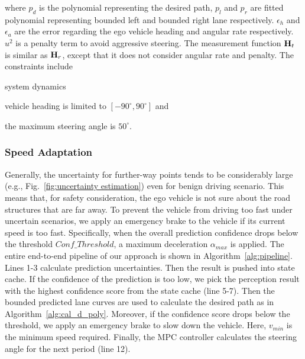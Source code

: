 where $p_{d}$ is the polynomial representing the desired path, $p_{l}$ and $p_{r}$ are fitted polynomial representing bounded left and bounded right lane respectively. $\epsilon_{h}$ and $\epsilon_{a}$ are the error regarding the ego vehicle heading and angular rate respectively. $u^{2}$ is a penalty term to avoid aggressive steering. The measurement function $\bold{H}_{t}$ is similar as $\bold{H}_{r}$, except that it does not consider angular rate and penalty. The constraints include
\begin{enumerate*}
\item system dynamics
\item vehicle heading is limited to $[-90^{\circ},90^{\circ}]$ and
\item the maximum steering angle is $50^{\circ}$.
\end{enumerate*}
\subsubsection{Speed Adaptation}
Generally, the uncertainty for further-way points tends to be considerably large (e.g., Fig.~\ref{fig:uncertainty estimation}) even for benign driving scenario. This means that, for safety consideration, the ego vehicle is not sure about the road structures that are far away. To prevent the vehicle from driving too fast under uncertain scenarios, we apply an emergency brake to the vehicle if its current speed is too fast. Specifically, when the overall prediction confidence drops below the threshold $Conf\_Threshold$, a maximum deceleration $\alpha_{max}$ is applied. The entire end-to-end pipeline of our approach is shown in Algorithm~\ref{alg:pipeline}. Lines 1-3 calculate prediction uncertainties. Then the result is pushed into state cache. If the confidence of the prediction is too low, we pick the perception result with the highest confidence score from the state cache (line 5-7). Then the bounded predicted lane curves are used to calculate the desired path as in Algorithm~\ref{alg:cal_d_poly}. Moreover, if the confidence score drops below the threshold, we apply an emergency brake to slow down the vehicle. Here, $v_{min}$ is the minimum speed required. Finally, the MPC controller calculates the steering angle for the next period (line 12).

